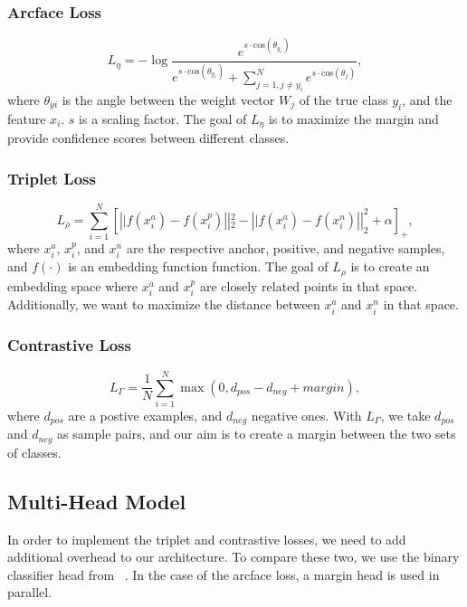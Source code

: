 \documentclass[10pt,twocolumn,letterpaper]{article}
\begin{document}
\subsubsection{Arcface Loss}
\begin{equation}
L_\eta = -\log \frac{e^{s\cdot \text{cos}(\theta_{y_i})}}{e^{s\cdot \text{cos}(\theta_{y_i})} + \sum_{j=1, j\neq y_i}^N e^{s\cdot \text{cos}(\theta_j)}},
\end{equation}
where $\theta_{yi}$ is the angle between the weight vector $W_j$ of the true class $y_i$, and the feature $x_i$. $s$ is a scaling factor. The goal of $L_\eta$ is to maximize 
the margin and provide confidence scores between different classes. 
\subsubsection{Triplet Loss}
\begin{equation}
    L_\rho = \sum_{i=1}^{N}\left[\left||f\left(x_{i}^{a}\right)-f\left(x_{i}^{p}\right)\right||_{2}^{2}-\left||f\left(x_{i}^{a}\right)-f\left(x_{i}^{n}\right)\right||_{2}^{2}+\alpha\right]_{+},
\end{equation}
where $x_i^a$, $x_i^p$, and $x_i^n$ are the respective anchor, positive, and negative samples, and $f(\cdot)$ is an embedding function function. The goal of $L_\rho$ is to create an embedding space where $x_i^a$ and $x_i^p$ are closely related points in that space. Additionally, 
we want to maximize the distance between $x_i^a$ and $x_i^n$ in that space.
\subsubsection{Contrastive Loss}
\begin{equation}
L_\Gamma = \frac{1}{N} \sum_{i=1}^N \max(0, d_{pos} - d_{neg} + margin),
\end{equation}
where $d_{pos}$ are a postive examples, and $d_{neg}$ negative ones. With $L_\Gamma$, we take $d_{pos}$ and $d_{neg}$ as sample pairs, and our aim is to create a margin between the two sets of classes.
\subsection{Multi-Head Model}
In order to implement the triplet and contrastive losses, we need to add additional overhead to our architecture. 
To compare these two, we use the binary classifier head from ~\cite{repo}.  In the case of the arcface loss, a margin head is used in parallel.
\end{document}
